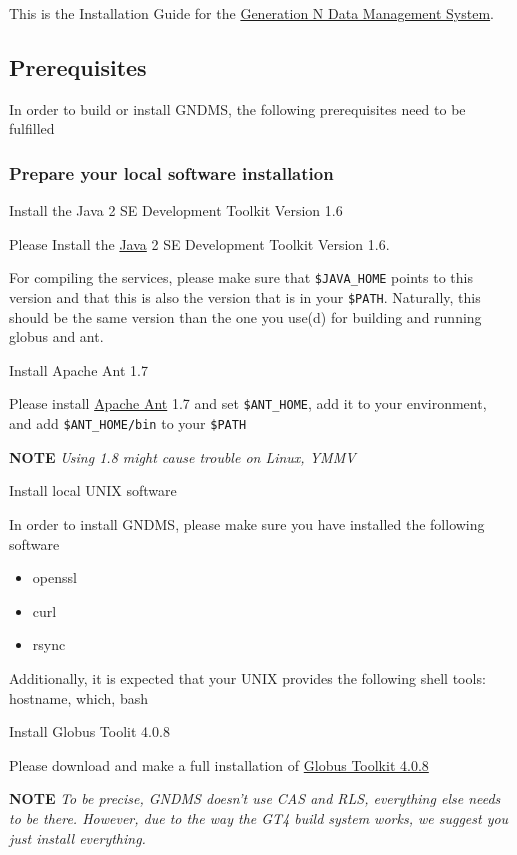 \documentclass{article}
\begin{document}
This is the Installation Guide for the
\href{%7B%7B%20page.root%20%7D%7Dindex.html}{Generation N Data Management System}.

\subsection{Prerequisites}

In order to build or install GNDMS, the following prerequisites
need to be fulfilled

\subsubsection{Prepare your local software installation}

Install the Java 2 SE Development Toolkit Version 1.6

Please Install the \href{http://java.sun.com}{Java} 2 SE
Development Toolkit Version 1.6.

For compiling the services, please make sure that \verb!$JAVA_HOME!
points to this version and that this is also the version that is in
your \verb!$PATH!. Naturally, this should be the same version than
the one you use(d) for building and running globus and ant.

Install Apache Ant 1.7

Please install \href{http://ant.apache.org}{Apache Ant} 1.7 and set
\verb!$ANT_HOME!, add it to your environment, and add
\verb!$ANT_HOME/bin! to your \verb!$PATH!

\textbf{NOTE} \emph{Using 1.8 might cause trouble on Linux, YMMV}

Install local UNIX software

In order to install GNDMS, please make sure you have installed the
following software

\begin{itemize}
\item
  openssl
\item
  curl
\item
  rsync
\end{itemize}
Additionally, it is expected that your UNIX provides the following
shell tools: hostname, which, bash

Install Globus Toolit 4.0.8

Please download and make a full installation of
\href{http://www.globus.org/toolkit/downloads/4.0.8/}{Globus Toolkit 4.0.8}

\textbf{NOTE}
\emph{To be precise, GNDMS doesn't use CAS and RLS, everything else needs to be there. However, due to the way the GT4 build system works, we suggest you just install everything.}
\end{document}
